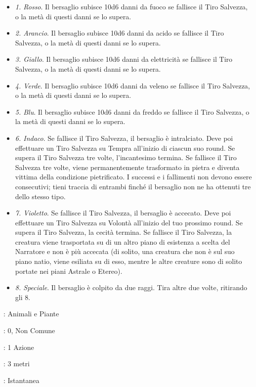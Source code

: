 \begin{multicols}{2}
\begin{itemize}[leftmargin=*] \setlength{\itemsep}{0pt}
	\item \emph{1. Rosso}. Il bersaglio subisce 10d6 danni da fuoco se fallisce il Tiro Salvezza, o la metà di questi danni se lo supera.
	\item \emph{2. Arancio}. Il bersaglio subisce 10d6 danni da acido se fallisce il Tiro Salvezza, o la metà di questi danni se lo supera.
	\item \emph{3. Giallo}. Il bersaglio subisce 10d6 danni da elettricità se fallisce il Tiro Salvezza, o la metà di questi danni se lo supera.
	\item \emph{4. Verde}. Il bersaglio subisce 10d6 danni da veleno se fallisce il Tiro Salvezza, o la metà di questi danni se lo supera.
	\item \emph{5. Blu}. Il bersaglio subisce 10d6 danni da freddo se fallisce il Tiro Salvezza, o la metà di questi danni se lo supera.
	\item \emph{6. Indaco}. Se fallisce il Tiro Salvezza, il bersaglio è intralciato. Deve poi effettuare un Tiro Salvezza su Tempra all'inizio di ciascun suo round. Se supera il Tiro Salvezza tre volte, l'incantesimo termina. Se fallisce il Tiro Salvezza tre volte, viene permanentemente trasformato in pietra e diventa vittima della condizione pietrificato. I successi e i fallimenti non devono essere consecutivi; tieni traccia di entrambi finché il bersaglio non ne ha ottenuti tre dello stesso tipo.
	\item \emph{7. Violetto}. Se fallisce il Tiro Salvezza, il bersaglio è accecato. Deve poi effettuare un Tiro Salvezza su Volontà all'inizio del tuo prossimo round. Se supera il Tiro Salvezza, la cecità termina. Se fallisce il Tiro Salvezza, la creatura viene trasportata su di un altro piano di esistenza a scelta del Narratore e non è più accecata (di solito, una creatura che non è sul suo piano natio, viene esiliata su di esso, mentre le altre creature sono di solito portate nei piani Astrale o Etereo).
	\item \emph{8. Speciale}. Il bersaglio è colpito da due raggi. Tira altre due volte, ritirando gli 8.

\end{itemize}

\noindent\colorbox{OBSSgold!10}{
\begin{minipage}{0.95\linewidth}
\begin{description}[noitemsep, topsep=0pt, parsep=0pt, partopsep=0pt, leftmargin=0cm, labelwidth=1.3cm]
	\item[\textbf{Lista}]: Animali e Piante
	\item[\textbf{Livello}]: 0, Non Comune
	\item[\textbf{Lancio}]: 1 Azione
	\item[\textbf{Gittata}]: 3 metri
	\item[\textbf{Durata}]: Istantanea
\end{description}
\end{minipage}}\smallskip


\end{multicols}
